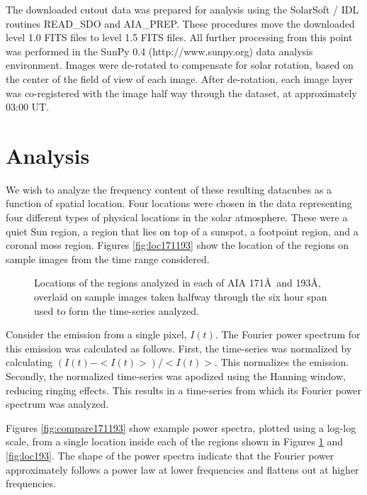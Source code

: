 \documentclass[manuscript]{../aastex52/aastex}
\begin{document}
The downloaded cutout data was prepared for analysis using the
SolarSoft / IDL routines READ\_SDO and AIA\_PREP.  These procedures
move the downloaded level 1.0 FITS files to level 1.5 FITS files.  All
further processing from this point was performed in the SunPy 0.4
(http://www.sunpy.org) data analysis environment.  Images were
de-rotated to compensate for solar rotation, based on the center of
the field of view of each image.  After de-rotation, each image layer
was co-registered with the image half way through the dataset, at
approximately 03:00 UT.

\section{Analysis}\label{sec:anal}

We wish to analyze the frequency content of these resulting datacubes
as a function of spatial location.  Four locations were chosen in the
data representing four different types of physical locations in the
solar atmosphere.  These were a quiet Sun region, a region that lies
on top of a sunspot, a footpoint region, and a coronal moss region.
Figures \ref{fig:loc171193} show the location of the regions on sample
images from the time range considered.

\begin{figure}
\label{fig:loc171}
\caption{Locations of the regions analyzed in each of AIA 171\AA\ and
  193\AA, overlaid on sample images taken halfway through the six hour
  span used to form the time-series analyzed.}
\end{figure}

Consider the emission from a single pixel, $I(t)$.  The Fourier power
spectrum for this emission was calculated as follows.  First, the
time-series was normalized by calculating $(I(t) - <I(t)>)/<I(t)>$.
This normalizes the emission.  Secondly, the normalized time-series
was apodized using the Hanning window, reducing ringing effects.  This
results in a time-series from which its Fourier power spectrum was
analyzed. 

Figures \ref{fig:compare171193} show example power spectra, plotted using
a log-log scale, from a single location inside each of the regions
shown in Figures \ref{fig:loc171} and \ref{fig:loc193}.  The shape of
the power spectra indicate that the Fourier power approximately
follows a power law at lower frequencies and flattens out at higher
frequencies.
\end{document}
